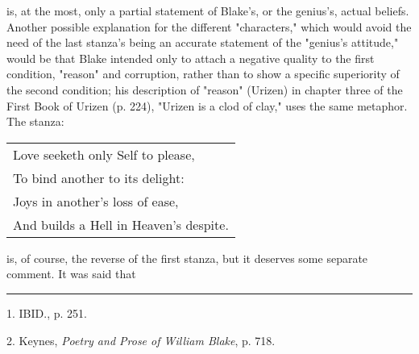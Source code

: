 is, at the most, only a partial statement of Blake's, or the genius's, actual beliefs. Another possible explanation for the
different "characters," which would avoid the need of the last stanza's being an accurate statement of the "genius's attitude," would be
that Blake intended only to attach a negative quality to the first condition, "reason" and corruption, rather than to show a specific
superiority of the second condition; his description of "reason" (Urizen) in chapter three of the First Book of Urizen (p. 224), "Urizen is a 
clod of clay," uses the same metaphor. The stanza:\par
\begin{center}
	\begin{tabular}{l}
		Love seeketh only Self to please, \\
		To bind another to its delight:   \\
		Joys in another's loss of ease,   \\
		And builds a Hell in Heaven's despite.\par
	\end{tabular}
\end{center}
is, of course, the reverse of the first stanza, but it deserves some separate comment. It was said that\linebreak
\null\par
\vspace*{-\baselineskip}
\vspace*{\fill}
\noindent\rule{0.25\textwidth}{0.4pt}\par
1. IBID., p. 251.\par
2. Keynes, \textit{Poetry and Prose of William Blake}, p. 718.\par

\newpage

